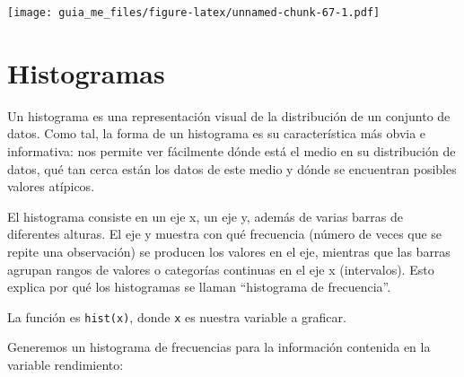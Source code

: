 \documentclass[]{book}
\newenvironment{Shaded}{\begin{snugshade}}{\end{snugshade}}
\newcommand{\DataTypeTok}[1]{\textcolor[rgb]{0.13,0.29,0.53}{#1}}
\newcommand{\DecValTok}[1]{\textcolor[rgb]{0.00,0.00,0.81}{#1}}
\newcommand{\FloatTok}[1]{\textcolor[rgb]{0.00,0.00,0.81}{#1}}
\newcommand{\KeywordTok}[1]{\textcolor[rgb]{0.13,0.29,0.53}{\textbf{#1}}}
\newcommand{\NormalTok}[1]{#1}
\newcommand{\OperatorTok}[1]{\textcolor[rgb]{0.81,0.36,0.00}{\textbf{#1}}}
\newcommand{\StringTok}[1]{\textcolor[rgb]{0.31,0.60,0.02}{#1}}
\begin{document}
\begin{Shaded}
\end{Shaded}

\texttt{[image: guia\_me\_files/figure-latex/unnamed-chunk-67-1.pdf]}

\hypertarget{histogramas}{%
\section{Histogramas}\label{histogramas}}

Un histograma es una representación visual de la distribución de un conjunto de datos. Como tal, la forma de
un histograma es su característica más obvia e informativa: nos permite ver fácilmente dónde está el medio
en su distribución de datos, qué tan cerca están los datos de este medio y dónde se encuentran posibles
valores atípicos.

El histograma consiste en un eje x, un eje y, además de varias barras de diferentes alturas. El eje y muestra
con qué frecuencia (número de veces que se repite una observación) se producen los valores en el eje,
mientras que las barras agrupan rangos de valores o categorías continuas en el eje x (intervalos). Esto explica
por qué los histogramas se llaman ``histograma de frecuencia''.

La función es \texttt{hist(x)}, donde \texttt{x} es nuestra variable a graficar.

Generemos un histograma de frecuencias para la información contenida en la variable rendimiento:

\begin{Shaded}
\end{Shaded}
\end{document}
